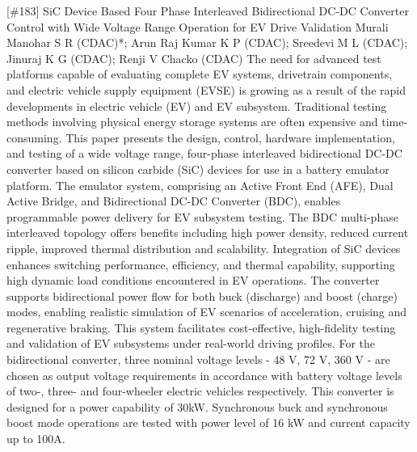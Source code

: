 {} \begin{abstract_online} {[\#183] SiC Device Based Four Phase Interleaved Bidirectional DC-DC Converter Control with Wide Voltage Range Operation for EV Drive Validation} {} {Murali Manohar S R (CDAC)*; Arun Raj Kumar K P (CDAC); Sreedevi M L (CDAC); Jinuraj K G (CDAC); Renji V Chacko (CDAC)} {} The need for advanced test platforms capable of evaluating complete EV systems, drivetrain components, and electric vehicle supply equipment (EVSE) is growing as a result of the rapid developments in electric vehicle (EV) and EV subsystem. Traditional testing methods involving physical energy storage systems are often expensive and time-consuming. This paper presents the design, control, hardware implementation, and testing of a wide voltage range, four-phase interleaved bidirectional DC-DC converter based on silicon carbide (SiC) devices for use in a battery emulator platform. The emulator system, comprising an Active Front End (AFE), Dual Active Bridge, and Bidirectional DC-DC Converter (BDC), enables programmable power delivery for EV subsystem testing. The BDC multi-phase interleaved topology offers benefits including high power density, reduced current ripple, improved thermal distribution and scalability. Integration of SiC devices enhances switching performance, efficiency, and thermal capability, supporting high dynamic load conditions encountered in EV operations. The converter supports bidirectional power flow for both buck (discharge) and boost (charge) modes, enabling realistic simulation of EV scenarios of acceleration, cruising and regenerative braking. This system facilitates cost-effective, high-fidelity testing and validation of EV subsystems under real-world driving profiles. For the bidirectional converter, three nominal voltage levels - 48 V, 72 V, 360 V - are chosen as output voltage requirements in accordance with battery voltage levels of two-, three- and four-wheeler electric vehicles respectively. This converter is designed for a power capability of 30kW. Synchronous buck and synchronous boost mode operations are tested with power level of 16 kW and current capacity up to 100A. \end{abstract_online} 
